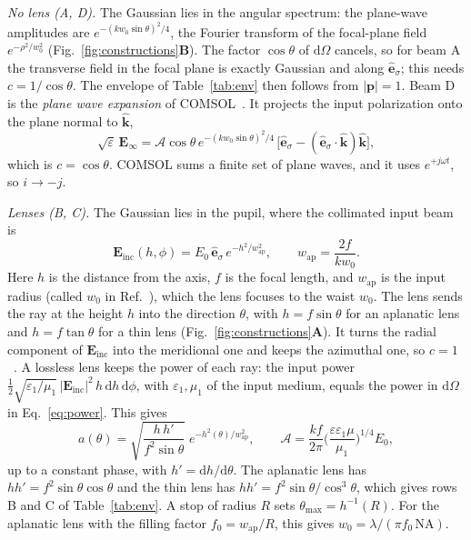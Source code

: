 \documentclass[
	aps,
	pra,
	reprint,
	amsmath,
	amssymb,
	superscriptaddress,
	nofootinbib
]{revtex4-2}
\begin{document}
\emph{No lens (A, D).} The Gaussian lies in the angular spectrum: the plane-wave amplitudes are $e^{-(kw_0\sin\theta)^2/4}$, the Fourier transform of the focal-plane field $e^{-\rho^2/w_0^2}$ (Fig.~\ref{fig:constructions}\textsf{\textbf{B}}). The factor $\cos\theta$ of $\mathrm{d}\Omega$ cancels, so for beam A the transverse field in the focal plane is exactly Gaussian and along $\mathbf{\hat e}_\sigma$; this needs $c=1/\cos\theta$. The envelope of Table~\ref{tab:env} then follows from $|\mathbf p|=1$. Beam D is the \emph{plane wave expansion} of COMSOL~\cite{COMSOL63WaveOptics,Mizuyama2018COMSOLBlog}. It projects the input polarization onto the plane normal to $\mathbf{\hat k}$,
\begin{equation}
    \sqrt{\varepsilon}\,\mathbf E_\infty=\mathcal A\cos\theta\,e^{-(kw_0\sin\theta)^2/4}\,\big[\mathbf{\hat e}_\sigma-(\mathbf{\hat e}_\sigma\cdot\mathbf{\hat k})\mathbf{\hat k}\big],
    \label{eq:comsol}
\end{equation}
which is $c=\cos\theta$. COMSOL sums a finite set of plane waves, and it uses $e^{+j\omega t}$, so $i\to-j$.

\emph{Lenses (B, C).} The Gaussian lies in the pupil, where the collimated input beam is~\cite[Eq.~(3.52)]{Novotny2012}
\begin{equation}
    \mathbf E_\mathrm{inc}(h,\phi)=E_0\,\mathbf{\hat e}_\sigma\,e^{-h^2/w_\mathrm{ap}^2},
    \qquad w_\mathrm{ap}=\frac{2f}{kw_0}.
    \label{eq:Einc}
\end{equation}
Here $h$ is the distance from the axis, $f$ is the focal length, and $w_\mathrm{ap}$ is the input radius (called $w_0$ in Ref.~\cite{Novotny2012}), which the lens focuses to the waist $w_0$. The lens sends the ray at the height $h$ into the direction $\theta$, with $h=f\sin\theta$ for an aplanatic lens and $h=f\tan\theta$ for a thin lens (Fig.~\ref{fig:constructions}\textsf{\textbf{A}}). It turns the radial component of $\mathbf E_\mathrm{inc}$ into the meridional one and keeps the azimuthal one, so $c=1$~\cite[Eq.~(3.39)]{Novotny2012}. A lossless lens keeps the power of each ray: the input power $\tfrac12\sqrt{\varepsilon_1/\mu_1}\,|\mathbf E_\mathrm{inc}|^2\,h\,\mathrm{d}h\,\mathrm{d}\phi$, with $\varepsilon_1,\mu_1$ of the input medium, equals the power in $\mathrm{d}\Omega$ in Eq.~\eqref{eq:power}. This gives
\begin{equation}
    a(\theta)=\sqrt{\frac{h\,h'}{f^2\sin\theta}}\;e^{-h^2(\theta)/w_\mathrm{ap}^2},
    \qquad
    \mathcal A=\frac{kf}{2\pi}\Big(\frac{\varepsilon\varepsilon_1\mu}{\mu_1}\Big)^{1/4}E_0,
    \label{eq:lens}
\end{equation}
up to a constant phase, with $h'=\mathrm{d}h/\mathrm{d}\theta$. The aplanatic lens has $hh'=f^2\sin\theta\cos\theta$ and the thin lens has $hh'=f^2\sin\theta/\cos^3\theta$, which gives rows B and C of Table~\ref{tab:env}. A stop of radius $R$ sets $\theta_{\max}=h^{-1}(R)$. For the aplanatic lens with the filling factor $f_0=w_\mathrm{ap}/R$, this gives $w_0=\lambda/(\pi f_0\,\mathrm{NA})$.
\end{document}
